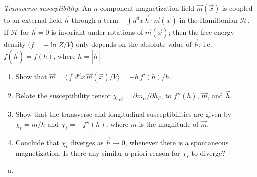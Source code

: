 \begin{problem}
    \textit{Transverse susceptibility}: An $n$-component magnetization field $\vec{m}(\vec{x})$ is coupled to an external field $\vec{h}$ through a term $-\int d^dx\,\vec{h}\cdot\vec{m}(\vec{x})$ in the Hamiltonian $\mathcal{H}$. If $\mathcal{H}$ for $\vec{h} = 0$ is invariant under rotations of $\vec{m}(\vec{x})$; then the free energy density ($f = -\ln Z/V$) only depends on the absolute value of $\vec{h}$; i.e.\ $f(\vec{h}) = f(h)$, where $h = |\vec{h}|$.

    \begin{enumerate}
        \item[(a)] Show that $\vec{m} = \langle\int d^dx\,\vec{m}(\vec{x})/V\rangle = -h\,f'(h)/h$.

        \item[(b)] Relate the susceptibility tensor $\chi_{\alpha\beta} = \partial m_\alpha/\partial h_\beta$, to $f''(h)$, $\vec{m}$, and $\vec{h}$.

        \item[(c)] Show that the transverse and longitudinal susceptibilities are given by $\chi_t = m/h$ and $\chi_\ell = -f''(h)$, where $m$ is the magnitude of $\vec{m}$.

        \item[(d)] Conclude that $\chi_t$ diverges as $\vec{h} \to 0$, whenever there is a spontaneous magnetization. Is there any similar a priori reason for $\chi_\ell$ to diverge?
    \end{enumerate}
\end{problem}

\begin{solution}
    \begin{enumerate}[(a)]
        \item
    \end{enumerate}
\end{solution}

